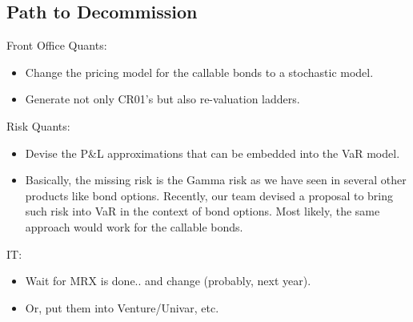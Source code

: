 \documentclass[10pt,a4paper]{article}
\begin{document}
\subsection{Path to Decommission}

Front Office Quants:
\begin{itemize}
	\item Change the pricing model for the callable bonds to a stochastic model. 
	\item Generate not only CR01's but also re-valuation ladders. 
\end{itemize}

Risk Quants:
\begin{itemize}
	\item Devise the P\&L approximations that can be embedded into the VaR model. 
	\item Basically, the missing risk is the Gamma risk as we have seen in several other products like bond options. Recently, our team devised a proposal to bring such risk into VaR in the context of bond options. Most likely, the same approach would work for the callable bonds.  
\end{itemize}

IT:
\begin{itemize}
	\item Wait for MRX is done.. and change (probably, next year). 
	\item Or, put them into Venture/Univar, etc.  
\end{itemize}
\end{document}

